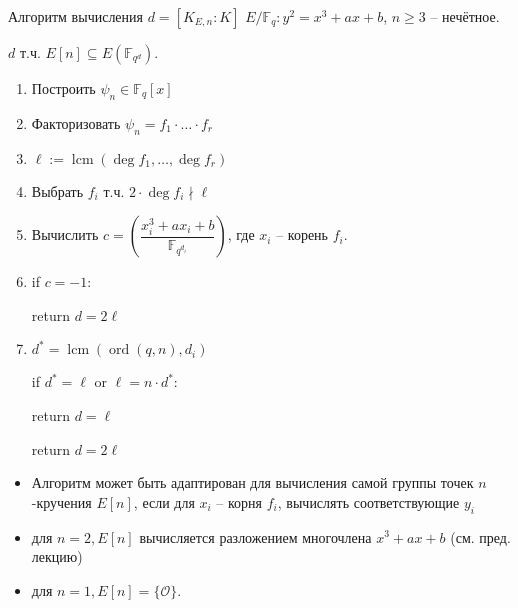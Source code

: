 \documentclass{beamer}
\begin{document}
\begin{frame}{Алгоритм вычисления $d = [K_{E,n}:K]$}
     $ E/\mathbb{F}_q: y^2 = x^3 + a x + b$, $n \geqslant 3$ -- нечётное.
    
     $d$ т.ч. $E[n] \subseteq E(\mathbb{F}_{q^d})$.
    
    \begin{enumerate}
        \item Построить $\psi_n \in \mathbb{F}_q[x]$
        \item Факторизовать $\psi_n = {f_1} \cdot \ldots \cdot {f_r}$
        \item $\ell := \operatorname{lcm}(\deg{f_1}, \ldots, \deg{f_r})$
        \item Выбрать $f_i$ т.ч. $2 \cdot \deg {f_i} \nmid \ell$
        \item Вычислить $c = \left(\dfrac{x_i^3 + a {x_i} + b}{\mathbb{F}_{q^{d_i}}}\right)$, где $x_i$ -- корень $f_i$.
        
        \item if $c = - 1$:
        
        \quad return $d = 2\ell$
        
        \item ${d^*} = \operatorname{lcm}( \operatorname{ord} ({q,n}),{d_i})$
        
        if ${d^*} = \ell$ or $\ell = n \cdot {d^*}$:
        
        \quad return $d = \ell$
        
        return $d = 2\ell$ 
    \end{enumerate}
\end{frame}

\begin{frame}{}
    \begin{itemize}
        \item Алгоритм может быть адаптирован для вычисления самой группы точек $n$-кручения $E[ n]$, если для ${x_i}$ -- корня ${f_i}$, вычислять соответствующие ${y_i}$
        \item для $n = 2, E[n]$ вычисляется разложением многочлена ${x^3} + a x + b$ (см.  пред. лекцию)
        \item для $n = 1, E[n] = \{ \mathcal{O} \}$. 
    \end{itemize}
\end{frame}
\end{document}
